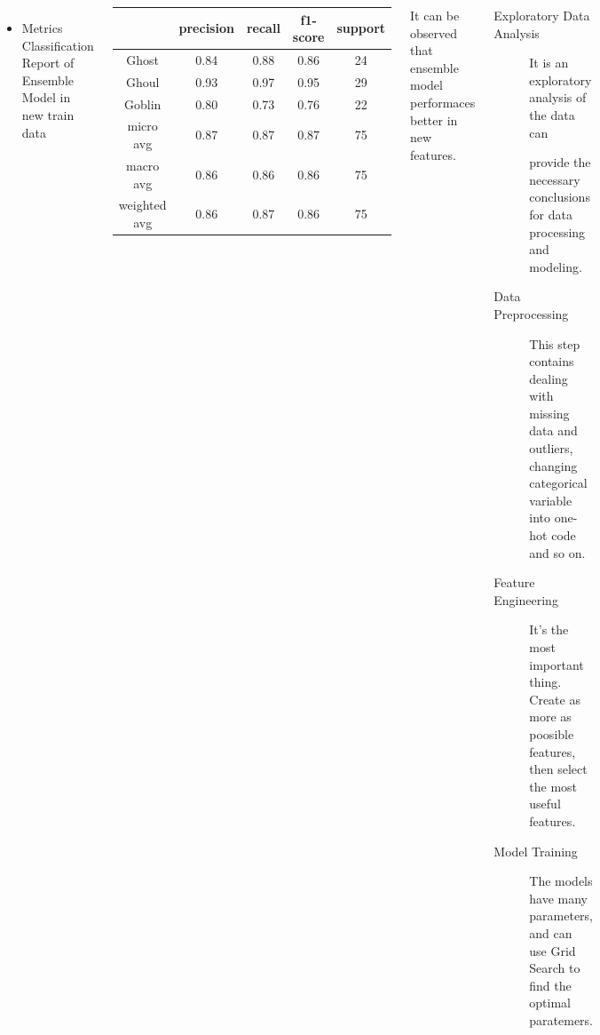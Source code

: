 \documentclass{tikzposter} %
\begin{document}
\begin{columns}
{	\begin{itemize}
		\item Metrics Classification Report of Ensemble Model in new train data
	\end{itemize}
	\vspace{.5cm}
	\begin{center}
		\begin{tabular}{ccccc}
			\hline
			&precision & recall & f1-score & support\\
			\hline
			Ghost  &  0.84  &  0.88  & 0.86 &  24\\
			Ghoul  &  0.93  & 0.97 &  0.95 &   29\\
			Goblin  &  0.80 &  0.73  & 0.76  &  22\\
			\hline
			micro avg & 0.87  & 0.87  & 0.87  & 75\\
			macro avg &  0.86  &  0.86 & 0.86 &   75\\
			weighted avg  &  0.86 & 0.87  &  0.86  &  75\\
			\hline 
		\end{tabular}
	\end{center}
	\vspace{.5cm}
	It can be observed that ensemble model
	performaces better in new features.
	
}


{
	\begin{description}
		\item[Exploratory Data Analysis] It is an 
		exploratory analysis of the data can 
		 
		provide the necessary conclusions 
		for data processing and modeling.
		\vspace{.5cm}
		\item[Data Preprocessing] This step contains
		dealing with missing data and outliers,
		changing categorical variable 
		into one-hot code and so on.
		\vspace{.5cm}
		\item[Feature Engineering] It's the 
		most important thing.
		Create as more as poosible features,
		then select the most useful features.
		\vspace{.5cm}
		\item[Model Training] The models have 
		many parameters,
		and can use Grid Search to find 
		the optimal paratemers.	
	\end{description}
}



\end{columns}
\end{document}
